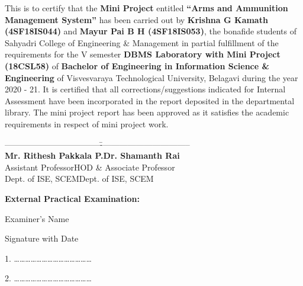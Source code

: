 \documentclass[12pt,a4paper]{report}
\begin{document}
\noindent This is to certify that the \textbf{Mini Project} entitled \textbf{``Arms and Ammunition\\ Management System''}  has been carried out by
\textbf{ Krishna G Kamath (4SF18IS044)} and \textbf{ Mayur Pai B H (4SF18IS053)}, the bonafide students of Sahyadri College of Engineering \& Management in partial fulfillment of the requirements for the V semester \textbf{DBMS Laboratory with Mini Project (18CSL58)} of \textbf{Bachelor of Engineering in Information Science \& Engineering} of Visvesvaraya Technological University, Belagavi during the year  2020 - 21. It is certified that all corrections/suggestions indicated for Internal Assessment have been incorporated in the report deposited in the departmental library. The mini project report has been approved as it satisfies the academic requirements in respect of mini project work.

\par
\vspace{0.75in}
\begin{tabbing}
-----------------------------------\hspace{2.5in}\=---------------------------------\\
\textbf{Mr. Rithesh Pakkala P.}\>\hspace{0.2in}\textbf{Dr. Shamanth Rai}\\
\hspace{0.30in}Assistant Professor\>\hspace{0.001in}HOD \& Associate Professor\\
\hspace{0.21in}Dept. of ISE, SCEM\>\hspace{0.2in}Dept. of ISE, SCEM\\

\end{tabbing}

\par
\vspace{0.25in}
\begin{center}
\large \textbf{External Practical Examination:}
\end{center}
\begin{flushleft}
\begin{normalsize}Examiner's Name \end{normalsize}
\hspace{7.5cm}
\begin{normalsize}Signature with Date\end{normalsize}
\end{flushleft}
\par
\vspace{0.05in}
\begin{flushleft}
1. \ldots\ldots\ldots\ldots\ldots\ldots \ldots \hspace{6.8cm}\ldots\ldots\ldots\ldots \ldots\ldots\ldots 
\par
\vspace{0.25in}	
2. \ldots\ldots\ldots\ldots\ldots\ldots \ldots \hspace{6.8cm}\ldots\ldots\ldots\ldots \ldots\ldots\ldots 
\end{flushleft}
\end{document}
